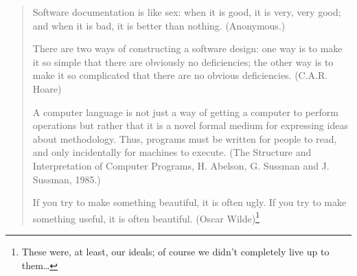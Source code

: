 
%
%
%
%


\nnormalsize
\ifprintedbook
\else
\begin{quote}
Software documentation is like sex:
when it is good, it is very, very good;
and when it is bad, it is better than nothing.
(Anonymous.)

There are two ways of constructing a software design: one way is
to make it so simple that there are obviously no
deficiencies; the other way is to make it so complicated that
there are no obvious deficiencies. (C.A.R. Hoare)

A computer language is not just a way of getting a computer to
perform operations but rather that it is a novel formal
medium for expressing ideas about methodology. Thus, programs
must be written for people to read, and only
incidentally for machines to execute.
(The Structure and Interpretation of Computer Programs, H. Abelson, G. Sussman
and J. Sussman, 1985.)

If you try to make something beautiful, it is often ugly.
If you try to make something useful, it is often beautiful.
(Oscar Wilde)\footnote{These were, at least, our ideals; of course we didn't
completely live up to them\ldots}
\end{quote}
\fi


